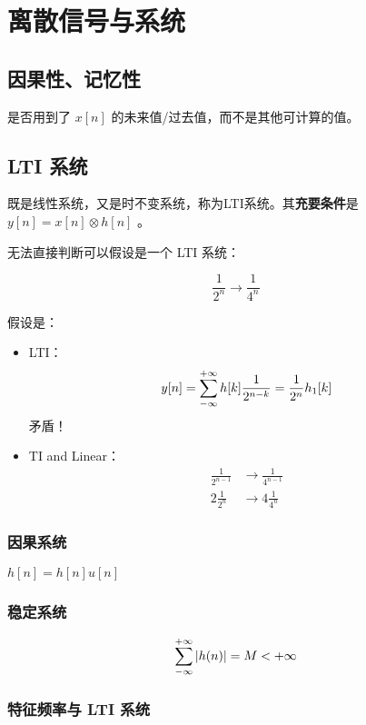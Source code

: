 \documentclass[cn,11pt,chinese,black,simple]{elegantbook}
\begin{document}
\fi 
\def\chapname{review}




\chapter{离散信号与系统}

\section{因果性、记忆性}

是否用到了 \(x[n]\) 的未来值/过去值，而不是其他可计算的值。

\section{LTI 系统}

既是线性系统，又是时不变系统，称为LTI系统。其\textbf{充要条件}是 \(y[n] = x[n] \otimes h[n]\) 。

无法直接判断可以假设是一个 LTI 系统： 

\[\frac{1}{2^n} \rightarrow \frac{1}{4^n}\] 

假设是：

 \begin{itemize}
     \item LTI：\[y[n] = \sum_{-\infty}^{+\infty} h[k] \frac{1}{2^{n-k}} = \frac{1}{2^n} h_1[k]\] 矛盾！
     \item TI and Linear： \[\begin{aligned}
        \frac{1}{2^{n-1}} &\rightarrow \frac{1}{4^{n-1}} \\
        2 \frac{1}{2^n} &\rightarrow 4 \frac{1}{4^n}
     \end{aligned}\]
 \end{itemize}

\subsection{因果系统}

\(h[n] = h[n] u[n]\) 

\subsection{稳定系统}

\[
\displaystyle\sum_{-\infty}^{+\infty} |h(n)| =M<+\infty
\]

\subsection{特征频率与 LTI 系统}
\end{document}
